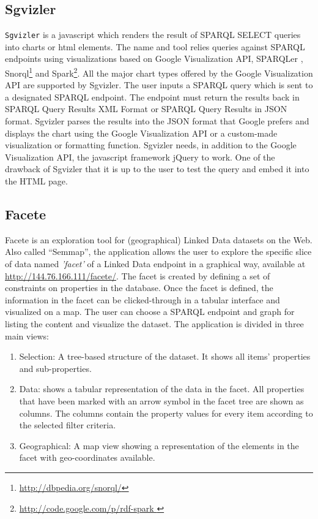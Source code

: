 \subsection{Sgvizler}
\texttt{Sgvizler} \cite{Martin2012} is a javascript which renders the result of SPARQL SELECT queries into charts or html elements. The name and tool relies queries against SPARQL endpoints using visualizations based on Google Visualization API, SPARQLer , Snorql\footnote{\url{http://dbpedia.org/snorql/}} and Spark\footnote{\url{http://code.google.com/p/rdf-spark }}. All the major chart types offered by the Google Visualization API are supported by Sgvizler. The user inputs a SPARQL query which is sent to a designated SPARQL endpoint. The endpoint must return the results back in SPARQL Query Results XML Format or SPARQL Query Results in JSON format. Sgvizler parses the results into the JSON format that Google prefers and displays the chart using the Google Visualization API or a custom-made visualization or formatting function. Sgvizler needs, in addition to the Google Visualization API, the javascript framework jQuery  to work. One of the drawback of Sgvizler that it is up to the user to test the query and embed it into the HTML page.
 
\subsection{Facete}
Facete \cite{facete:2014} is an exploration tool for (geographical) Linked Data datasets on the Web. Also called ``Semmap'', the application allows the user to explore the specific slice of data named \textit{'facet'}  of a Linked Data endpoint in a graphical way, available at \url{http://144.76.166.111/facete/}. The facet is created by defining a set of constraints on properties in the database. Once the facet is defined, the information in the facet can be clicked-through in a tabular interface and visualized on a map. The user can choose a SPARQL endpoint and graph for listing the content and visualize the dataset. The application is divided in three main views:
\begin{enumerate}
\item Selection: A tree-based structure of the dataset. It shows all items' properties and sub-properties. 
\item  Data: shows a tabular representation of the data in the facet. All properties that have been marked with an arrow symbol in the facet tree are shown as columns. The columns contain the property values for every item according to the selected filter criteria.
\item Geographical: A map view showing a representation of the elements in the facet with geo-coordinates available.
\end{enumerate}

